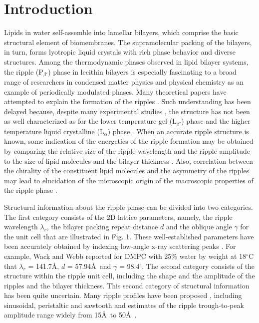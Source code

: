\section{Introduction}

Lipids in water self-assemble into lamellar bilayers, which comprise the basic
structural element of biomembranes.   The supramolecular packing of the
bilayers, in turn, forms lyotropic liquid crystals with rich phase behavior
and diverse structures.  Among the thermodynamic phases observed in
lipid bilayer systems, the ripple (P$_{\beta '}$) phase in lecithin bilayers
is especially fascinating to a broad range of researchers in condensed matter
physics and physical chemistry as an example of periodically modulated phases.
Many theoretical papers have attempted to explain the formation of the ripples
\cite{Don79,Mar84,Haw86,Car87,Gol88,McCu90,Hon91,Lub93}. 
Such understanding has been delayed because, despite many
experimental studies
\cite{Tar73,JanSS79,Luna77,Ino80,Cop80,Sta82,Rup83,Ale85,Sir88,Wac89a,Kat95},
the structure has not been as well characterized as for the lower temperature 
gel (L$_{\beta '}$) phase \cite{Sun94} and the higher temperature liquid 
crystalline (L$_{\alpha}$) phase \cite{Nagle96}.  When an accurate ripple
structure is known, some indication of the energetics of the ripple formation
may be obtained by comparing the relative size of the ripple
wavelength and the ripple amplitude to the size of lipid molecules and
the bilayer thickness \cite{Gol88}.  Also, correlation 
between the chirality of the constituent lipid molecules and the asymmetry of 
the ripples may lead to elucidation of the microscopic origin 
of the macroscopic properties of the ripple phase \cite{Lub93,Kat95}.

Structural information about the ripple phase can be divided into two
categories. The first category consists of the 2D lattice parameters, namely, 
the ripple wavelength $\lambda_r$, the bilayer packing repeat distance $d$ and
the oblique angle $\gamma$ for the unit cell that are illustrated
in Fig. 1.  These well-established parameters have been accurately
obtained by indexing low-angle x-ray scattering peaks
\cite{Tar73,JanSS79,Ino80,Ale85,Wac89a}. 
For example, Wack and Webb \cite{Wac89a} reported for DMPC with
25\% water by weight at 18$^{\circ}$C that 
$\lambda_r$ = 141.7\AA, $d$ = 57.94\AA\
and $\gamma$ = 98.4$^{\circ}$.  The second category
consists of the structure within the ripple unit cell, including
the shape and the amplitude of the ripples and the bilayer thickness. 
This second category of structural information
has been quite uncertain.  Many ripple profiles have been 
proposed \cite{Don79,Mar84,Car87,Gol88,McCu90,Hon91,Lub93,Tar73,JanSS79,Sta82},
including sinusoidal, peristaltic and sawtooth and
estimates of the ripple trough-to-peak 
amplitude range widely from 15\AA\ to 50\AA\ 
\cite{Tar73,JanSS79,Sta82,Zas88a,Hata93}.

